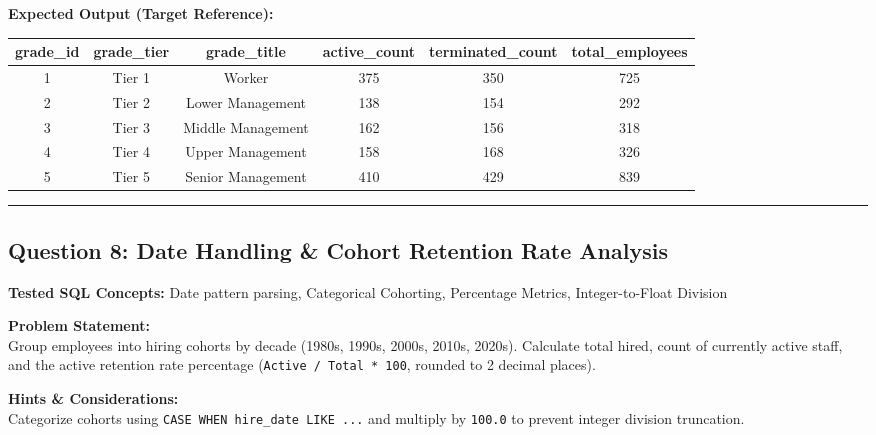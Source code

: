 \documentclass[11pt,a4paper]{article}
\begin{document}
\vspace{0.3cm}
\noindent\textbf{Expected Output (Target Reference):}
\begin{center}
\small
\begin{tabular}{cccccc}
\toprule
\textbf{grade\_id} & \textbf{grade\_tier} & \textbf{grade\_title} & \textbf{active\_count} & \textbf{terminated\_count} & \textbf{total\_employees} \\
\midrule
1 & Tier 1 & Worker & 375 & 350 & 725 \\
2 & Tier 2 & Lower Management & 138 & 154 & 292 \\
3 & Tier 3 & Middle Management & 162 & 156 & 318 \\
4 & Tier 4 & Upper Management & 158 & 168 & 326 \\
5 & Tier 5 & Senior Management & 410 & 429 & 839 \\
\bottomrule
\end{tabular}
\end{center}

\vspace{0.4cm}
\noindent\rule{\textwidth}{0.4pt}
\vspace{0.4cm}

\subsection*{Question 8: Date Handling & Cohort Retention Rate Analysis}

\noindent\textbf{Tested SQL Concepts:} Date pattern parsing, Categorical Cohorting, Percentage Metrics, Integer-to-Float Division

\vspace{0.15cm}
\noindent\textbf{Problem Statement:} \\
Group employees into hiring cohorts by decade (1980s, 1990s, 2000s, 2010s, 2020s). Calculate total hired, count of currently active staff, and the active retention rate percentage (\texttt{Active / Total * 100}, rounded to 2 decimal places).

\vspace{0.2cm}
\noindent\textbf{Hints \& Considerations:} \\
Categorize cohorts using \texttt{CASE WHEN hire\_date LIKE ...} and multiply by \texttt{100.0} to prevent integer division truncation.
\end{document}
